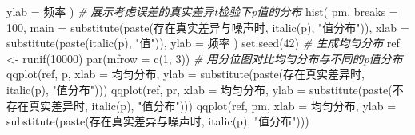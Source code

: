 \documentclass[]{tufte-book}
\newenvironment{Shaded}{}{}
\newcommand{\AttributeTok}[1]{\textcolor[rgb]{0.49,0.56,0.16}{#1}}
\newcommand{\CommentTok}[1]{\textcolor[rgb]{0.38,0.63,0.69}{\textit{#1}}}
\newcommand{\DecValTok}[1]{\textcolor[rgb]{0.25,0.63,0.44}{#1}}
\newcommand{\FunctionTok}[1]{\textcolor[rgb]{0.02,0.16,0.49}{#1}}
\newcommand{\NormalTok}[1]{#1}
\newcommand{\OtherTok}[1]{\textcolor[rgb]{0.00,0.44,0.13}{#1}}
\newcommand{\StringTok}[1]{\textcolor[rgb]{0.25,0.44,0.63}{#1}}
\begin{document}
\begin{Shaded}
\begin{Highlighting}[]
        \AttributeTok{ylab =} \StringTok{\textquotesingle{}频率\textquotesingle{}}
\NormalTok{)}
\CommentTok{\# 展示考虑误差的真实差异t检验下p值的分布}
\FunctionTok{hist}\NormalTok{(}
\NormalTok{        pm,}
        \AttributeTok{breaks =} \DecValTok{100}\NormalTok{,}
        \AttributeTok{main =} \FunctionTok{substitute}\NormalTok{(}\FunctionTok{paste}\NormalTok{(}\StringTok{\textquotesingle{}存在真实差异与噪声时\textquotesingle{}}\NormalTok{, }\FunctionTok{italic}\NormalTok{(}\StringTok{\textquotesingle{}p\textquotesingle{}}\NormalTok{), }\StringTok{"值分布"}\NormalTok{)),}
        \AttributeTok{xlab =} \FunctionTok{substitute}\NormalTok{(}\FunctionTok{paste}\NormalTok{(}\FunctionTok{italic}\NormalTok{(}\StringTok{\textquotesingle{}p\textquotesingle{}}\NormalTok{), }\StringTok{"值"}\NormalTok{)),}
        \AttributeTok{ylab =} \StringTok{\textquotesingle{}频率\textquotesingle{}}
\NormalTok{)}
\FunctionTok{set.seed}\NormalTok{(}\DecValTok{42}\NormalTok{)}
\CommentTok{\# 生成均匀分布}
\NormalTok{ref }\OtherTok{\textless{}{-}} \FunctionTok{runif}\NormalTok{(}\DecValTok{10000}\NormalTok{)}
\FunctionTok{par}\NormalTok{(}\AttributeTok{mfrow =} \FunctionTok{c}\NormalTok{(}\DecValTok{1}\NormalTok{, }\DecValTok{3}\NormalTok{))}
\CommentTok{\# 用分位图对比均匀分布与不同的p值分布}
\FunctionTok{qqplot}\NormalTok{(ref, p, }\AttributeTok{xlab =} \StringTok{\textquotesingle{}均匀分布\textquotesingle{}}\NormalTok{, }\AttributeTok{ylab =} \FunctionTok{substitute}\NormalTok{(}\FunctionTok{paste}\NormalTok{(}\StringTok{\textquotesingle{}存在真实差异时\textquotesingle{}}\NormalTok{, }\FunctionTok{italic}\NormalTok{(}\StringTok{\textquotesingle{}p\textquotesingle{}}\NormalTok{), }\StringTok{"值分布"}\NormalTok{)))}
\FunctionTok{qqplot}\NormalTok{(ref, pr, }\AttributeTok{xlab =} \StringTok{\textquotesingle{}均匀分布\textquotesingle{}}\NormalTok{, }\AttributeTok{ylab =} \FunctionTok{substitute}\NormalTok{(}\FunctionTok{paste}\NormalTok{(}\StringTok{\textquotesingle{}不存在真实差异时\textquotesingle{}}\NormalTok{, }\FunctionTok{italic}\NormalTok{(}\StringTok{\textquotesingle{}p\textquotesingle{}}\NormalTok{), }\StringTok{"值分布"}\NormalTok{)))}
\FunctionTok{qqplot}\NormalTok{(ref, pm, }\AttributeTok{xlab =} \StringTok{\textquotesingle{}均匀分布\textquotesingle{}}\NormalTok{, }\AttributeTok{ylab =} \FunctionTok{substitute}\NormalTok{(}\FunctionTok{paste}\NormalTok{(}\StringTok{\textquotesingle{}存在真实差异与噪声时\textquotesingle{}}\NormalTok{, }\FunctionTok{italic}\NormalTok{(}\StringTok{\textquotesingle{}p\textquotesingle{}}\NormalTok{), }\StringTok{"值分布"}\NormalTok{)))}

\end{Highlighting}
\end{Shaded}
\end{document}

